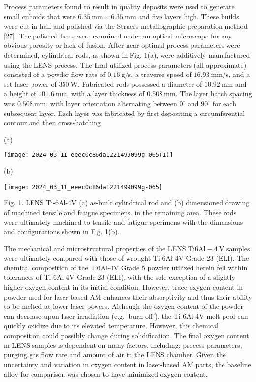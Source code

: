 \documentclass[10pt]{article}
\begin{document}
Process parameters found to result in quality deposits were used to generate small cuboids that were $6.35 \mathrm{~mm} \times 6.35 \mathrm{~mm}$ and five layers high. These builds were cut in half and polished via the Struers metallographic preparation method [27]. The polished faces were examined under an optical microscope for any obvious porosity or lack of fusion. After near-optimal process parameters were determined, cylindrical rods, as shown in Fig. 1(a), were additively manufactured using the LENS process. The final utilized process parameters (all approximate) consisted of a powder flow rate of $0.16 \mathrm{~g} / \mathrm{s}$, a traverse speed of $16.93 \mathrm{~mm} / \mathrm{s}$, and a set laser power of $350 \mathrm{~W}$. Fabricated rods possessed a diameter of $10.92 \mathrm{~mm}$ and a height of $101.6 \mathrm{~mm}$, with a layer thickness of $0.508 \mathrm{~mm}$. The layer hatch spacing was $0.508 \mathrm{~mm}$, with layer orientation alternating between $0^{\circ}$ and $90^{\circ}$ for each subsequent layer. Each layer was fabricated by first depositing a circumferential contour and then cross-hatching

(a)

\begin{center}
\texttt{[image: 2024\_03\_11\_eeec0c86da1221499099g-065(1)]}
\end{center}

(b)

\begin{center}
\texttt{[image: 2024\_03\_11\_eeec0c86da1221499099g-065]}
\end{center}

Fig. 1. LENS Ti-6Al-4V (a) as-built cylindrical rod and (b) dimensioned drawing of machined tensile and fatigue specimens. in the remaining area. These rods were ultimately machined to tensile and fatigue specimens with the dimensions and configurations shown in Fig. 1(b).

The mechanical and microstructural properties of the LENS Ti$6 \mathrm{Al}-4 \mathrm{~V}$ samples were ultimately compared with those of wrought Ti-6Al-4V Grade 23 (ELI). The chemical composition of the Ti6Al-4V Grade 5 powder utilized herein fell within tolerances of Ti-6Al-4V Grade 23 (ELI), with the sole exception of a slightly higher oxygen content in its initial condition. However, trace oxygen content in powder used for laser-based AM enhances their absorptivity and thus their ability to be melted at lower laser powers. Although the oxygen content of the powder can decrease upon laser irradiation (e.g. 'burn off'), the Ti-6Al-4V melt pool can quickly oxidize due to its elevated temperature. However, this chemical composition could possibly change during solidification. The final oxygen content in LENS samples is dependent on many factors, including: process parameters, purging gas flow rate and amount of air in the LENS chamber. Given the uncertainty and variation in oxygen content in laser-based AM parts, the baseline alloy for comparison was chosen to have minimized oxygen content.
\end{document}
